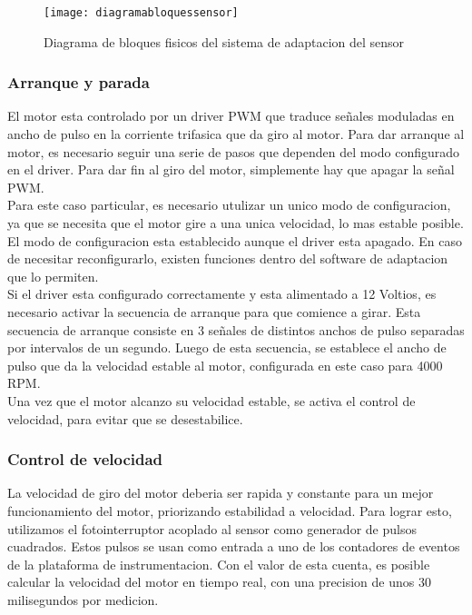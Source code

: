 \begin{figure}[h]
  \centering
  \texttt{[image: diagramabloquessensor]}
  \caption{Diagrama de bloques fisicos del sistema de adaptacion del sensor}\label{fig:diagramabloquessensor}
\end{figure}

\subsubsection{Arranque y parada} %
\label{ssub:arranque_y_parada}

El motor esta controlado por un driver PWM que traduce señales moduladas en ancho de pulso en la corriente trifasica que da giro al motor. Para dar arranque al motor, es necesario seguir una serie de pasos que dependen del modo configurado en el driver. Para dar fin al giro del motor, simplemente hay que apagar la señal PWM. \\

Para este caso particular, es necesario utulizar un unico modo de configuracion, ya que se necesita que el motor gire a una unica velocidad, lo mas estable posible. El modo de configuracion esta establecido aunque el driver esta apagado. En caso de necesitar reconfigurarlo, existen funciones dentro del software de adaptacion que lo permiten. \\

Si el driver esta configurado correctamente y esta alimentado a 12 Voltios, es necesario activar la secuencia de arranque para que comience a girar. Esta secuencia de arranque consiste en 3 señales de distintos anchos de pulso separadas por intervalos de un segundo. Luego de esta secuencia, se establece el ancho de pulso que da la velocidad estable al motor, configurada en este caso para 4000 RPM. \\

Una vez que el motor alcanzo su velocidad estable, se activa el control de velocidad, para evitar que se desestabilice. 


\subsubsection{Control de velocidad} %
\label{ssub:control_de_velocidad}

La velocidad de giro del motor deberia ser rapida y constante para un mejor funcionamiento del motor, priorizando estabilidad a velocidad. Para lograr esto, utilizamos el fotointerruptor acoplado al sensor como generador de pulsos cuadrados. Estos pulsos se usan como entrada a uno de los contadores de eventos de la plataforma de instrumentacion. Con el valor de esta cuenta, es posible calcular la velocidad del motor en tiempo real, con una precision de unos 30 milisegundos por medicion. \\

